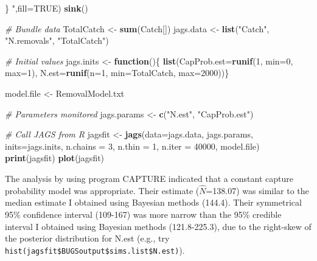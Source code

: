 \documentclass[
]{krantz}
\makeatletter
\newenvironment{Shaded}{\begin{snugshade}}{\end{snugshade}}
\newcommand{\AttributeTok}[1]{\textcolor[rgb]{0.27,0.27,0.27}{#1}}
\newcommand{\CommentTok}[1]{\textcolor[rgb]{0.37,0.37,0.37}{\textit{#1}}}
\newcommand{\ConstantTok}[1]{\textcolor[rgb]{0.37,0.37,0.37}{#1}}
\newcommand{\ControlFlowTok}[1]{\textcolor[rgb]{0.27,0.27,0.27}{\textbf{#1}}}
\newcommand{\DecValTok}[1]{\textcolor[rgb]{0.06,0.06,0.06}{#1}}
\newcommand{\FunctionTok}[1]{\textcolor[rgb]{0.27,0.27,0.27}{\textbf{#1}}}
\newcommand{\NormalTok}[1]{#1}
\newcommand{\OtherTok}[1]{\textcolor[rgb]{0.37,0.37,0.37}{#1}}
\newcommand{\StringTok}[1]{\textcolor[rgb]{0.5,0.5,0.5}{#1}}
\newenvironment{kframe}{%
\medskip{}
\setlength{\fboxsep}{.8em}
 \def\at@end@of@kframe{}%
 \ifinner\ifhmode%
  \def\at@end@of@kframe{\end{minipage}}%
  \begin{minipage}{\columnwidth}%
 \fi\fi%
 \def\FrameCommand##1{\hskip\@totalleftmargin \hskip-\fboxsep
 \colorbox{shadecolor}{##1}\hskip-\fboxsep
     \hskip-\linewidth \hskip-\@totalleftmargin \hskip\columnwidth}%
 \MakeFramed {\advance\hsize-\width
   \@totalleftmargin\z@ \linewidth\hsize
   \@setminipage}}%
 {\par\unskip\endMakeFramed%
 \at@end@of@kframe}
\renewenvironment{Shaded}{\begin{kframe}}{\end{kframe}}
\makeatother
\begin{document}
\begin{Shaded}
\begin{Highlighting}[]
\StringTok{\}}
\StringTok{      "}\NormalTok{,}\AttributeTok{fill=}\ConstantTok{TRUE}\NormalTok{)}
\FunctionTok{sink}\NormalTok{()}

\CommentTok{\# Bundle data}
\NormalTok{TotalCatch }\OtherTok{\textless{}{-}} \FunctionTok{sum}\NormalTok{(Catch[])}
\NormalTok{jags.data }\OtherTok{\textless{}{-}} \FunctionTok{list}\NormalTok{(}\StringTok{"Catch"}\NormalTok{, }\StringTok{"N.removals"}\NormalTok{, }\StringTok{"TotalCatch"}\NormalTok{)}


\CommentTok{\# Initial values}
\NormalTok{jags.inits }\OtherTok{\textless{}{-}} \ControlFlowTok{function}\NormalTok{()\{ }\FunctionTok{list}\NormalTok{(}\AttributeTok{CapProb.est=}\FunctionTok{runif}\NormalTok{(}\DecValTok{1}\NormalTok{, }\AttributeTok{min=}\DecValTok{0}\NormalTok{, }\AttributeTok{max=}\DecValTok{1}\NormalTok{),}
                               \AttributeTok{N.est=}\FunctionTok{runif}\NormalTok{(}\AttributeTok{n=}\DecValTok{1}\NormalTok{, }\AttributeTok{min=}\NormalTok{TotalCatch,}
                                           \AttributeTok{max=}\DecValTok{2000}\NormalTok{))\}}

\NormalTok{model.file }\OtherTok{\textless{}{-}} \StringTok{\textquotesingle{}RemovalModel.txt\textquotesingle{}}

\CommentTok{\# Parameters monitored}
\NormalTok{jags.params }\OtherTok{\textless{}{-}} \FunctionTok{c}\NormalTok{(}\StringTok{"N.est"}\NormalTok{, }\StringTok{"CapProb.est"}\NormalTok{)}

\CommentTok{\# Call JAGS from R}
\NormalTok{jagsfit }\OtherTok{\textless{}{-}} \FunctionTok{jags}\NormalTok{(}\AttributeTok{data=}\NormalTok{jags.data, jags.params, }\AttributeTok{inits=}\NormalTok{jags.inits,}
                \AttributeTok{n.chains =} \DecValTok{3}\NormalTok{, }\AttributeTok{n.thin =} \DecValTok{1}\NormalTok{, }\AttributeTok{n.iter =} \DecValTok{40000}\NormalTok{,}
\NormalTok{                model.file)}
\FunctionTok{print}\NormalTok{(jagsfit)}
\FunctionTok{plot}\NormalTok{(jagsfit)}
\end{Highlighting}
\end{Shaded}

The analysis by \citet{otis.etal_1978} using program CAPTURE indicated that a constant capture probability model was appropriate. Their estimate (\(\hat{N}\)=138.07) was similar to the median estimate I obtained using Bayesian methods (144.4). Their symmetrical 95\% confidence interval (109-167) was more narrow than the 95\% credible interval I obtained using Bayesian methods (121.8-225.3), due to the right-skew of the posterior distribution for N.est (e.g., try \texttt{hist(jagsfit\$BUGSoutput\$sims.list\$N.est)}).
\end{document}
